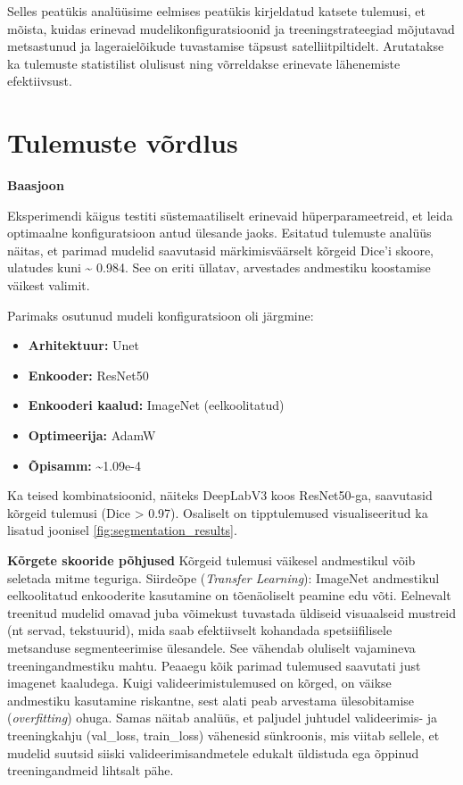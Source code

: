 Selles peatükis analüüsime eelmises peatükis kirjeldatud katsete tulemusi, et mõista, kuidas erinevad mudelikonfiguratsioonid ja treeningstrateegiad mõjutavad metsastunud ja lageraielõikude tuvastamise täpsust satelliitpiltidelt. Arutatakse ka tulemuste statistilist olulisust ning võrreldakse erinevate lähenemiste efektiivsust.
\section{Tulemuste võrdlus}
\textbf{Baasjoon}

Eksperimendi käigus testiti süstemaatiliselt erinevaid hüperparameetreid, et leida optimaalne konfiguratsioon antud ülesande jaoks. 
Esitatud tulemuste analüüs näitas, et parimad mudelid
saavutasid märkimisväärselt kõrgeid Dice'i skoore, ulatudes kuni \textasciitilde
0.984. See on eriti üllatav, arvestades andmestiku koostamise väikest valimit.

Parimaks osutunud mudeli konfiguratsioon oli järgmine:
\begin{itemize}
  \item \textbf{Arhitektuur:} Unet
  \item \textbf{Enkooder:} ResNet50
  \item \textbf{Enkooderi kaalud:} ImageNet (eelkoolitatud)
  \item \textbf{Optimeerija:} AdamW
  \item \textbf{Õpisamm:} \textasciitilde 1.09e-4
\end{itemize}

Ka teised kombinatsioonid,
näiteks DeepLabV3 koos ResNet50-ga, saavutasid kõrgeid tulemusi (Dice > 0.97).
Osaliselt on tipptulemused visualiseeritud ka lisatud joonisel \ref{fig:segmentation_results}.

\textbf{Kõrgete skooride põhjused}
Kõrgeid tulemusi väikesel andmestikul võib seletada mitme teguriga.
Siirdeõpe (\textit{Transfer Learning}): ImageNet andmestikul eelkoolitatud enkooderite
kasutamine on tõenäoliselt peamine edu võti. Eelnevalt treenitud mudelid omavad
juba võimekust tuvastada üldiseid visuaalseid mustreid (nt servad, tekstuurid),
mida saab efektiivselt kohandada spetsiifilisele metsanduse segmenteerimise
ülesandele. See vähendab oluliselt vajamineva treeningandmestiku mahtu. Peaaegu
kõik parimad tulemused saavutati just imagenet kaaludega. 
Kuigi valideerimistulemused on kõrged, on väikse andmestiku kasutamine riskantne, sest alati peab arvestama ülesobitamise (\textit{overfitting}) ohuga. Samas näitab analüüs, et paljudel juhtudel valideerimis- ja treeningkahju
(val\_loss, train\_loss) vähenesid sünkroonis, mis viitab sellele, et mudelid
suutsid siiski valideerimisandmetele edukalt üldistuda ega õppinud
treeningandmeid lihtsalt pähe.

